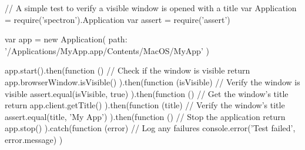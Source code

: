 \begin{javascriptcode}
// A simple test to verify a visible window is opened with a title
var Application = require('spectron').Application
var assert = require('assert')

var app = new Application({
  path: '/Applications/MyApp.app/Contents/MacOS/MyApp'
})

app.start().then(function () {
  // Check if the window is visible
  return app.browserWindow.isVisible()
}).then(function (isVisible) {
  // Verify the window is visible
  assert.equal(isVisible, true)
}).then(function () {
  // Get the window's title
  return app.client.getTitle()
}).then(function (title) {
  // Verify the window's title
  assert.equal(title, 'My App')
}).then(function () {
  // Stop the application
  return app.stop()
}).catch(function (error) {
  // Log any failures
  console.error('Test failed', error.message)
})
\end{javascriptcode}
